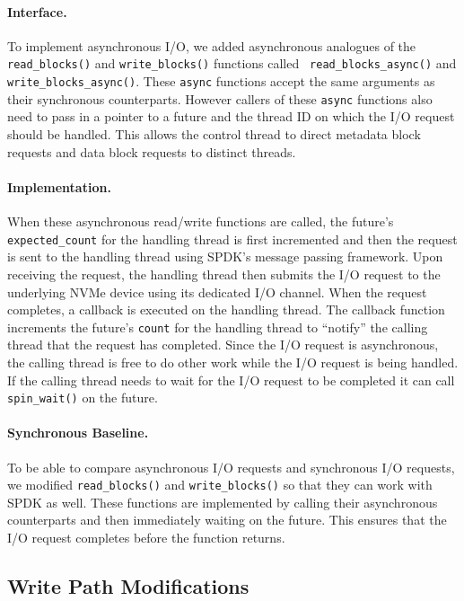\paragraph{Interface.}
To implement asynchronous I/O, we added asynchronous analogues of the {\tt
read\_blocks()} and {\tt write\_blocks()} functions called {\tt
read\_blocks\_async()} and {\tt write\_blocks\_async()}. These {\tt async}
functions accept the same arguments as their synchronous counterparts. However
callers of these {\tt async} functions also need to pass in a pointer to a
future and the thread ID on which the I/O request should be handled. This
allows the control thread to direct metadata block requests and data block
requests to distinct threads.

\paragraph{Implementation.}
When these asynchronous read/write functions are called, the future's {\tt
expected\_count} for the handling thread is first incremented and then the
request is sent to the handling thread using SPDK's message passing framework.
Upon receiving the request, the handling thread then submits the I/O request
to the underlying NVMe device using its dedicated I/O channel. When the request
completes, a callback is executed on the handling thread. The callback function
increments the future's {\tt count} for the handling thread to ``notify'' the
calling thread that the request has completed. Since the I/O request is
asynchronous, the calling thread is free to do other work while the I/O request
is being handled. If the calling thread needs to wait for the I/O request to
be completed it can call {\tt spin\_wait()} on the future.

\paragraph{Synchronous Baseline.}
To be able to compare asynchronous I/O requests and synchronous I/O
requests, we modified {\tt read\_blocks()} and {\tt write\_blocks()} so that
they can work with SPDK as well. These functions are implemented by calling
their asynchronous counterparts and then immediately waiting on the future.
This ensures that the I/O request completes before the function returns.

\subsection{Write Path Modifications}\label{sec:writepath}

